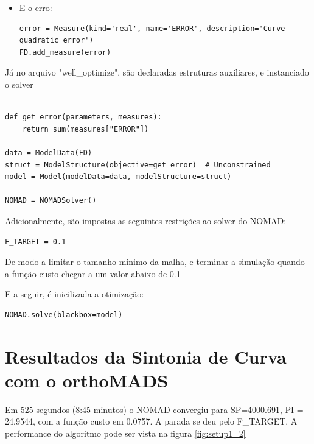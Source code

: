 \begin{itemize}
\item E o erro:
\begin{verbatim}
error = Measure(kind='real', name='ERROR', description='Curve quadratic error')
FD.add_measure(error)
\end{verbatim}
\end{itemize}

Já no arquivo "well\_optimize", são declaradas estruturas auxiliares, e instanciado o solver

\begin{verbatim}

def get_error(parameters, measures):
    return sum(measures["ERROR"])

data = ModelData(FD)
struct = ModelStructure(objective=get_error)  # Unconstrained
model = Model(modelData=data, modelStructure=struct)

NOMAD = NOMADSolver()

\end{verbatim}



Adicionalmente, são impostas as seguintes restrições ao solver do NOMAD:
\begin{verbatim}
F_TARGET = 0.1
\end{verbatim}

De modo a limitar o tamanho mínimo da malha, e terminar a simulação quando a função custo chegar a um valor abaixo de 0.1

E a seguir, é inicilizada a otimização:
\begin{verbatim}
NOMAD.solve(blackbox=model)
\end{verbatim}


\section{Resultados da Sintonia de Curva com o orthoMADS}

Em 525 segundos (8:45 minutos) o NOMAD convergiu para SP=4000.691, PI = 24.9544, com a função custo em 0.0757. A parada se deu pelo F\_TARGET. A performance do algoritmo pode ser vista na figura \ref{fig:setup1_2}


